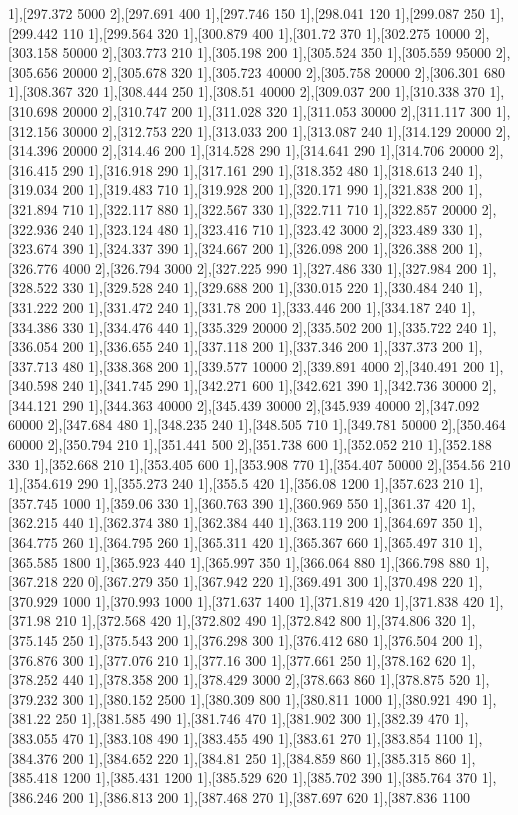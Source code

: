 {1],[297.372 5000 2],[297.691 400 1],[297.746 150 1],[298.041 120 1],[299.087 250 1],[299.442 110 1],[299.564 320 1],[300.879 400 1],[301.72 370 1],[302.275 10000 2],[303.158 50000 2],[303.773 210 1],[305.198 200 1],[305.524 350 1],[305.559 95000 2],[305.656 20000 2],[305.678 320 1],[305.723 40000 2],[305.758 20000 2],[306.301 680 1],[308.367 320 1],[308.444 250 1],[308.51 40000 2],[309.037 200 1],[310.338 370 1],[310.698 20000 2],[310.747 200 1],[311.028 320 1],[311.053 30000 2],[311.117 300 1],[312.156 30000 2],[312.753 220 1],[313.033 200 1],[313.087 240 1],[314.129 20000 2],[314.396 20000 2],[314.46 200 1],[314.528 290 1],[314.641 290 1],[314.706 20000 2],[316.415 290 1],[316.918 290 1],[317.161 290 1],[318.352 480 1],[318.613 240 1],[319.034 200 1],[319.483 710 1],[319.928 200 1],[320.171 990 1],[321.838 200 1],[321.894 710 1],[322.117 880 1],[322.567 330 1],[322.711 710 1],[322.857 20000 2],[322.936 240 1],[323.124 480 1],[323.416 710 1],[323.42 3000 2],[323.489 330 1],[323.674 390 1],[324.337 390 1],[324.667 200 1],[326.098 200 1],[326.388 200 1],[326.776 4000 2],[326.794 3000 2],[327.225 990 1],[327.486 330 1],[327.984 200 1],[328.522 330 1],[329.528 240 1],[329.688 200 1],[330.015 220 1],[330.484 240 1],[331.222 200 1],[331.472 240 1],[331.78 200 1],[333.446 200 1],[334.187 240 1],[334.386 330 1],[334.476 440 1],[335.329 20000 2],[335.502 200 1],[335.722 240 1],[336.054 200 1],[336.655 240 1],[337.118 200 1],[337.346 200 1],[337.373 200 1],[337.713 480 1],[338.368 200 1],[339.577 10000 2],[339.891 4000 2],[340.491 200 1],[340.598 240 1],[341.745 290 1],[342.271 600 1],[342.621 390 1],[342.736 30000 2],[344.121 290 1],[344.363 40000 2],[345.439 30000 2],[345.939 40000 2],[347.092 60000 2],[347.684 480 1],[348.235 240 1],[348.505 710 1],[349.781 50000 2],[350.464 60000 2],[350.794 210 1],[351.441 500 2],[351.738 600 1],[352.052 210 1],[352.188 330 1],[352.668 210 1],[353.405 600 1],[353.908 770 1],[354.407 50000 2],[354.56 210 1],[354.619 290 1],[355.273 240 1],[355.5 420 1],[356.08 1200 1],[357.623 210 1],[357.745 1000 1],[359.06 330 1],[360.763 390 1],[360.969 550 1],[361.37 420 1],[362.215 440 1],[362.374 380 1],[362.384 440 1],[363.119 200 1],[364.697 350 1],[364.775 260 1],[364.795 260 1],[365.311 420 1],[365.367 660 1],[365.497 310 1],[365.585 1800 1],[365.923 440 1],[365.997 350 1],[366.064 880 1],[366.798 880 1],[367.218 220 0],[367.279 350 1],[367.942 220 1],[369.491 300 1],[370.498 220 1],[370.929 1000 1],[370.993 1000 1],[371.637 1400 1],[371.819 420 1],[371.838 420 1],[371.98 210 1],[372.568 420 1],[372.802 490 1],[372.842 800 1],[374.806 320 1],[375.145 250 1],[375.543 200 1],[376.298 300 1],[376.412 680 1],[376.504 200 1],[376.876 300 1],[377.076 210 1],[377.16 300 1],[377.661 250 1],[378.162 620 1],[378.252 440 1],[378.358 200 1],[378.429 3000 2],[378.663 860 1],[378.875 520 1],[379.232 300 1],[380.152 2500 1],[380.309 800 1],[380.811 1000 1],[380.921 490 1],[381.22 250 1],[381.585 490 1],[381.746 470 1],[381.902 300 1],[382.39 470 1],[383.055 470 1],[383.108 490 1],[383.455 490 1],[383.61 270 1],[383.854 1100 1],[384.376 200 1],[384.652 220 1],[384.81 250 1],[384.859 860 1],[385.315 860 1],[385.418 1200 1],[385.431 1200 1],[385.529 620 1],[385.702 390 1],[385.764 370 1],[386.246 200 1],[386.813 200 1],[387.468 270 1],[387.697 620 1],[387.836 1100 }
